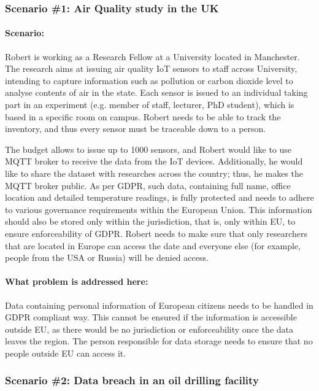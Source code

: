 \subsubsection{Scenario \#1: Air Quality study in the UK}
\paragraph{\textbf{Scenario:}}
Robert is working as a Research Fellow at a University located in Manchester. The research aims at issuing air quality IoT sensors to staff across University, intending to capture information such as pollution or carbon dioxide level to analyse contents of air in the state. Each sensor is issued to an individual taking part in an experiment (e.g. member of staff, lecturer, PhD student), which is based in a specific room on campus. Robert needs to be able to track the inventory, and thus every sensor must be traceable down to a person.

The budget allows to issue up to 1000 sensors, and Robert would like to use MQTT broker to receive the data from the IoT devices. Additionally, he would like to share the dataset with researches across the country; thus, he makes the MQTT broker public. As per GDPR, such data, containing full name, office location and detailed temperature readings, is fully protected and needs to adhere to various governance requirements within the European Union. This information should also be stored only within the jurisdiction, that is, only within EU, to ensure enforceability of GDPR. Robert needs to make sure that only researchers that are located in Europe can access the date and everyone else (for example, people from the USA or Russia) will be denied access.

\paragraph{\textbf{What problem is addressed here:}}
Data containing personal information of European citizens needs to be handled in GDPR compliant way. This cannot be ensured if the information is accessible outside EU, as there would be no jurisdiction or enforceability once the data leaves the region. The person responsible for data storage needs to ensure that no people outside EU can access it.
\\
\subsubsection{Scenario \#2: Data breach in an oil drilling facility}
